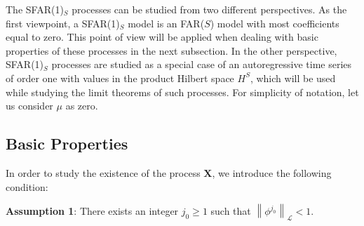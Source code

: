 \documentclass[11pt,a4paper]{article}
\numberwithin{equation}{section}
\begin{document}
The SFAR(1)$_S$ processes can be studied from two different perspectives. As the first viewpoint, a SFAR(1)$_S$ model is an FAR($S$) model with most coefficients equal to zero. This point of view will be applied when dealing with basic properties of these processes in the next subsection. In the other perspective, SFAR(1)$_S$ processes are studied as a special case of an autoregressive time series of order one with values in the product Hilbert space $H^S$, which will be used while studying the limit theorems of such processes. For simplicity of notation, let us consider $\mu$ as zero.


\subsection{Basic Properties}

In order to study the existence of the process $\bm{X}$, we introduce the following condition:

\textbf{Assumption 1}: There exists an integer $j_0\geq 1$ such that $\left\|\phi^{j_0}\right\|_\mathcal{L}<1$.
\end{document}
